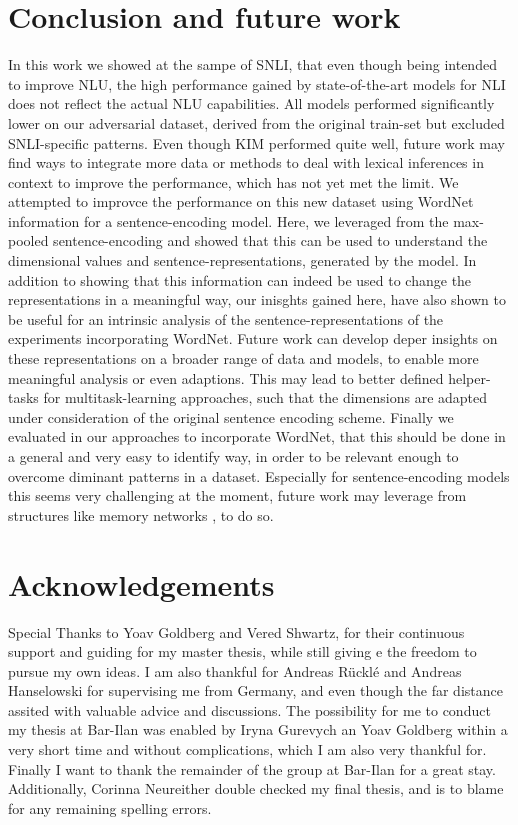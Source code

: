 \section{Conclusion and future work}
In this work we showed at the sampe of \ac{SNLI}, that even though being intended to improve \ac{NLU}, the high performance gained by state-of-the-art models for \ac{NLI} does not reflect the actual \ac{NLU} capabilities. All models performed significantly lower on our adversarial dataset, derived from the original train-set but excluded  \ac{SNLI}-specific patterns. Even though \ac{KIM} performed quite well, future work may find ways to integrate more data or methods to deal with lexical inferences in context to improve the performance, which has not yet met the limit. We attempted to improvce the performance on this new dataset using WordNet information for a sentence-encoding model. Here, we leveraged from the max-pooled sentence-encoding and showed that this can be used to understand the dimensional values and sentence-representations, generated by the model. In addition to showing that this information can indeed be used to change the representations in a meaningful way, our inisghts gained here, have also shown to be useful for an intrinsic analysis of the sentence-representations of the experiments incorporating WordNet. Future work can develop deper insights on these representations on a broader range of data and models, to enable more meaningful analysis or even adaptions. This may lead to better defined helper-tasks for multitask-learning approaches, such that the dimensions are adapted under consideration of the original sentence encoding scheme. Finally we evaluated in our approaches to incorporate WordNet, that this should be done in a general and very easy to identify way, in order to be relevant enough to overcome diminant patterns in a dataset. Especially for sentence-encoding models this seems very challenging at the moment, future work may leverage from structures like memory networks \citep{sukhbaatar2015end}, to do so.

\section*{Acknowledgements}
Special Thanks to Yoav Goldberg and Vered Shwartz, for their continuous support and guiding for my master thesis, while still giving e the freedom to pursue my own ideas. I am also thankful for Andreas Rücklé and Andreas Hanselowski for supervising me from Germany, and even though the far distance assited with valuable advice and discussions. The possibility for me to conduct my thesis at Bar-Ilan was enabled by Iryna Gurevych an Yoav Goldberg within a very short time and without complications, which I am also very thankful for. Finally I want to thank the remainder of the group at Bar-Ilan for a great stay. Additionally, Corinna Neureither double checked my final thesis, and is to blame for any remaining spelling errors.